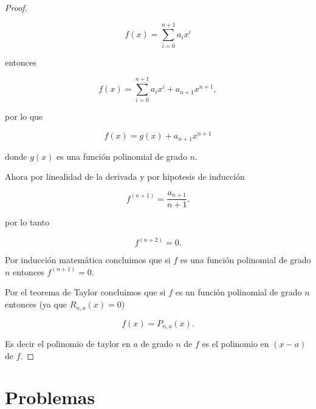 \documentclass[letterpaper]{article}
\theoremstyle{definition}
\theoremstyle{lemathm}
\theoremstyle{lemademthm}
\begin{document}
\begin{enumerate}
\begin{proof}
\begin{itemize}
				\[f(x) = \sum_{i=0}^{n+1} a_ix^i\]
				
				entonces 
				
				\[f(x) = \sum_{i=0}^{n+1} a_ix^i + a_{n+1}x^{n+1},\]

				por lo que 
				
				\[f(x) = g(x) + a_{n+1}x^{n+1}\]
				
				donde $g(x)$ es una función polinomial de grado $n$.
				
				Ahora por linealidad de la derivada y por hipotesis de inducción
				
				\[f^{(n+1)} = \frac{a_{n+1}}{n+1}.\]
				
				por lo tanto
				
				\[f^{(n+2)} = 0.\]
				
			\end{itemize}

			Por inducción matemática concluimos que si $f$ es una función polinomial de grado $n$ entonces $f^{(n+1)} = 0$.
				
			Por el teorema de Taylor concluimos que si $f$ es un función polinomial de grado $n$ entonces (ya que $R_{n,a}(x) = 0$)

			\[f(x) = P_{n,a}(x).\]
			
			Es decir el polinomio de taylor en $a$ de grado $n$ de $f$ es el polinomio en $(x-a)$ de $f$.

		\end{proof}

	\end{enumerate}

	\newpage

    \section*{Problemas}
\end{document}
